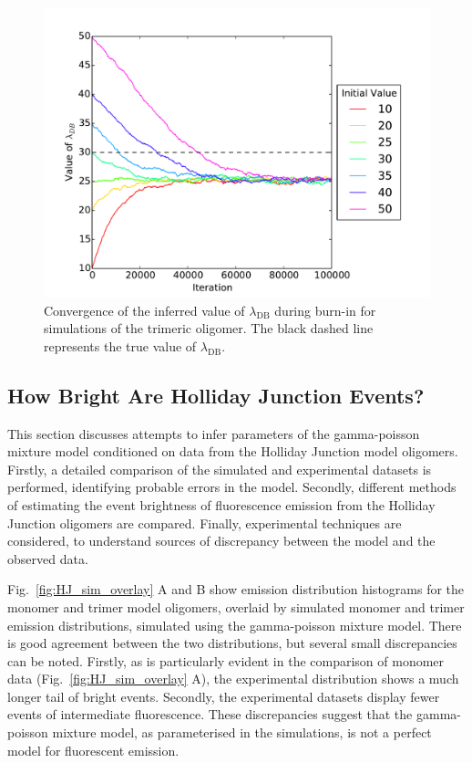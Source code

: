 \begin{figure}
   \begin{center}
      \includegraphics*[clip=true, width=6in]{sizing/Convergence.pdf}
      \caption{Convergence of the inferred value of $\lambda_{\text{DB}}$ during burn-in for simulations of the trimeric oligomer. The black dashed line represents the true value of $\lambda_{\text{DB}}$.}
      \label{fig:convergence}
   \end{center}
\end{figure}

\subsection{How Bright Are Holliday Junction Events?}
This section discusses attempts to infer parameters of the gamma-poisson mixture model conditioned on data from the Holliday Junction model oligomers. Firstly, a detailed comparison of the simulated and experimental datasets is performed, identifying probable errors in the model. Secondly, different methods of estimating the event brightness of fluorescence emission from the Holliday Junction oligomers are compared. Finally, experimental techniques are considered, to understand sources of discrepancy between the model and the observed data.

Fig.~\ref{fig:HJ_sim_overlay} A and B show emission distribution histograms for the monomer and trimer model oligomers, overlaid by simulated monomer and trimer emission distributions, simulated using the gamma-poisson mixture model. There is good agreement between the two distributions, but several small discrepancies can be noted. Firstly, as is particularly evident in the comparison of monomer data (Fig.~\ref{fig:HJ_sim_overlay} A), the experimental distribution shows a much longer tail of bright events. Secondly, the experimental datasets display fewer events of intermediate fluorescence. These discrepancies suggest that the gamma-poisson mixture model, as parameterised in the simulations, is not a perfect model for fluorescent emission.

